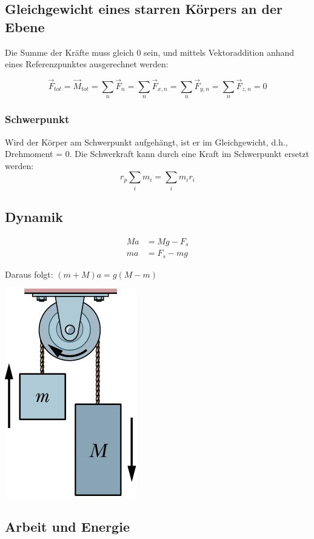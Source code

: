 \documentclass[a4paper]{scrartcl}
\begin{document}
\subsection{Gleichgewicht eines starren Körpers an der Ebene}	
	Die Summe der Kräfte muss gleich 0 sein, und mittels Vektoraddition anhand eines Referenzpunktes ausgerechnet werden:
	
	\[
	\vec{F}_{tot} = \vec{M}_{tot} = \sum_n{\vec{F}_n} =\sum_n{\vec{F}_{x,n}} = \sum_n{\vec{F}_{y,n}} = \sum_n{\vec{F}_{z,n}} = 0
	\]


\subsubsection{Schwerpunkt}
	Wird der Körper am Schwerpunkt aufgehängt, ist er im Gleichgewicht, d.h., Drehmoment = 0. Die Schwerkraft kann durch eine Kraft im Schwerpunkt ersetzt werden:
	\[
		r_p \sum_i{m_i} = \sum_i{m_ir_i} %
	\]

\pagebreak

\subsection{Dynamik}
	\begin{multicols}{2}
		\begin{align*}
		Ma &= Mg - F_s \\
		ma &=F_s - mg
		\end{align*}
		
		Daraus folgt: $(m + M)a = g(M - m)$
		
		\includegraphics[width=0.3\linewidth]{img/dynamik}
	\end{multicols}

\subsection{Arbeit und Energie}
\end{document}
